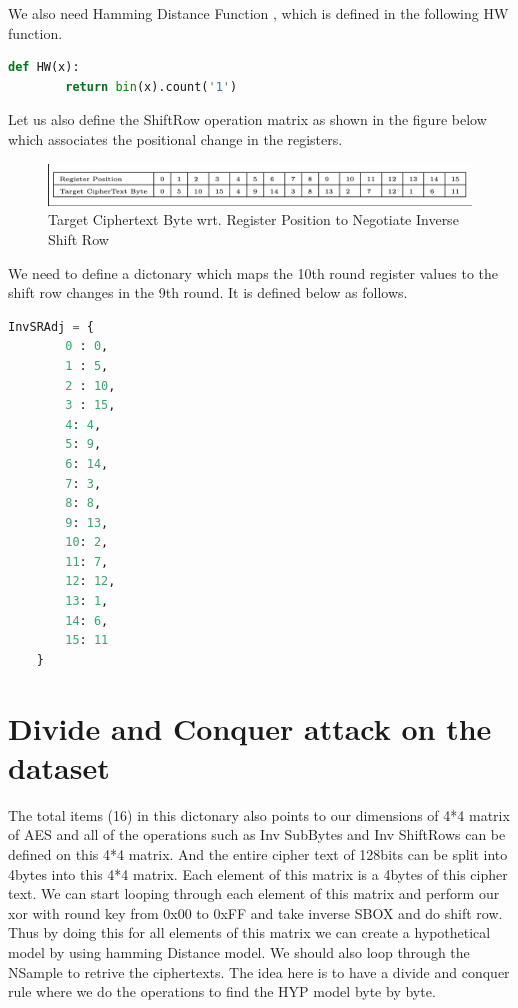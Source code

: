 \documentclass[12pt, letterpaper, oneside]{report}
\begin{document}
We also need Hamming Distance Function , which is defined in the following HW function.\\

\begin{lstlisting}[language=Python, caption=Hamming Distance Function]
    def HW(x):
        return bin(x).count('1')
\end{lstlisting}

Let us also define the ShiftRow operation matrix as shown in the figure below which associates the positional change in the registers.\\

\begin{figure}[H]
    \centering
    \includegraphics[width=1\linewidth]{image.png}
    \caption{Target Ciphertext Byte wrt. Register Position to Negotiate Inverse Shift
    Row}
    \label{fig:enter-label}
\end{figure}

We need to define a dictonary which maps the 10th round register values to the shift row changes in the 9th round. It is defined below as follows.\\



\begin{lstlisting}[language=Python, caption=dict for the inverse SR ]
    InvSRAdj = {
        0 : 0, 
        1 : 5, 
        2 : 10, 
        3 : 15, 
        4: 4, 
        5: 9, 
        6: 14, 
        7: 3, 
        8: 8, 
        9: 13, 
        10: 2, 
        11: 7, 
        12: 12, 
        13: 1, 
        14: 6, 
        15: 11
    }
\end{lstlisting}

\section{Divide and Conquer attack on the dataset}

The total items (16) in this dictonary also points to our dimensions of 4*4 matrix of AES and all of the operations such as Inv SubBytes and Inv ShiftRows can be defined on this 4*4 matrix. And the entire cipher text of 128bits can be split into 4bytes into this 4*4 matrix. Each element of this matrix is a 4bytes of this cipher text. We can start looping through each element of this matrix and perform our xor with round key from 0x00 to 0xFF and take inverse SBOX and do shift row. Thus by doing this for all elements of this matrix we can create a hypothetical model by using hamming Distance model. We should also loop through the NSample to retrive the ciphertexts. The idea here is to have a divide and conquer rule where we do the operations to find the HYP model byte by byte.\\
\end{document}
